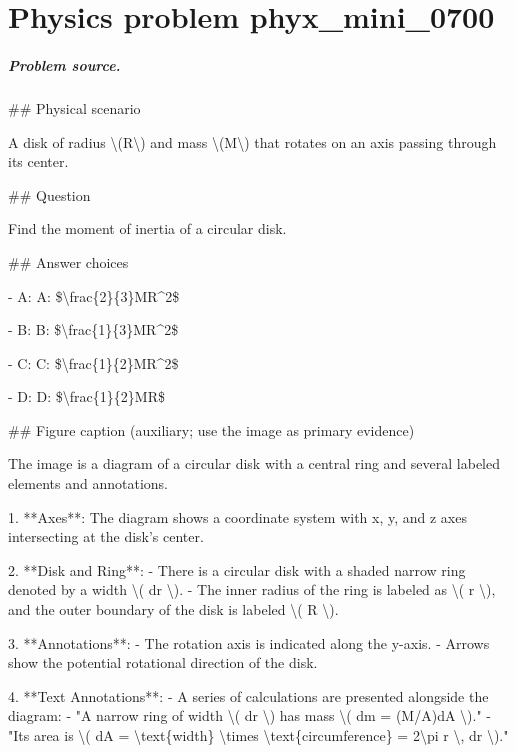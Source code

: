 
\chapter{Physics problem phyx\_mini\_0700}
\label{ch:PhyXMiniProblems_problem_phyx_mini_0700}

\paragraph{Problem source.}
\#\# Physical scenario

A disk of radius \textbackslash{}(R\textbackslash{}) and mass \textbackslash{}(M\textbackslash{}) that rotates on an axis passing through its center.

\#\# Question

Find the moment of inertia of a circular disk.

\#\# Answer choices

- A: A: \$\textbackslash{}frac\{2\}\{3\}MR\textasciicircum{}2\$

- B: B: \$\textbackslash{}frac\{1\}\{3\}MR\textasciicircum{}2\$

- C: C: \$\textbackslash{}frac\{1\}\{2\}MR\textasciicircum{}2\$

- D: D: \$\textbackslash{}frac\{1\}\{2\}MR\$

\#\# Figure caption (auxiliary; use the image as primary evidence)

The image is a diagram of a circular disk with a central ring and several labeled elements and annotations. 

1. **Axes**: The diagram shows a coordinate system with x, y, and z axes intersecting at the disk's center.

2. **Disk and Ring**: 
   - There is a circular disk with a shaded narrow ring denoted by a width \textbackslash{}( dr \textbackslash{}). 
   - The inner radius of the ring is labeled as \textbackslash{}( r \textbackslash{}), and the outer boundary of the disk is labeled \textbackslash{}( R \textbackslash{}).

3. **Annotations**:
   - The rotation axis is indicated along the y-axis.
   - Arrows show the potential rotational direction of the disk.

4. **Text Annotations**: 
   - A series of calculations are presented alongside the diagram:
     - "A narrow ring of width \textbackslash{}( dr \textbackslash{}) has mass \textbackslash{}( dm = (M/A)dA \textbackslash{})."
     - "Its area is \textbackslash{}( dA = \textbackslash{}text\{width\} \textbackslash{}times \textbackslash{}text\{circumference\} = 2\textbackslash{}pi r \textbackslash{}, dr \textbackslash{})."

